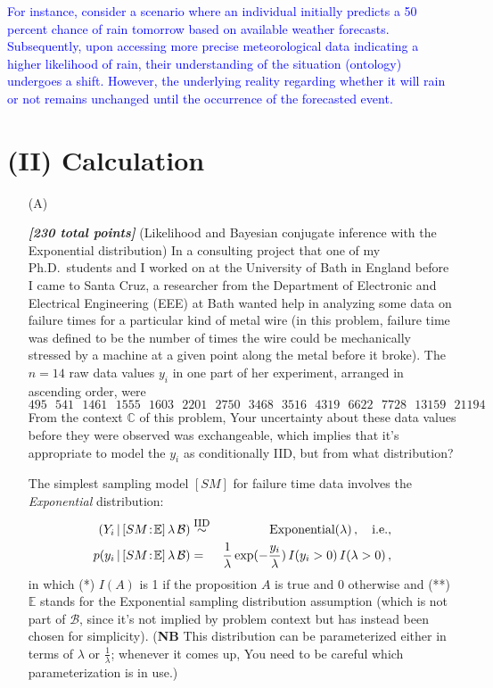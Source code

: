 \documentclass[12pt]{article}
\newcommand{\given}{\, | \,}
\newcommand{\bi}[1]{\b{\i{#1}}}
\renewcommand{\b}[1]{\textbf{#1}}
\renewcommand{\i}[1]{\textit{#1}}
\renewcommand{\r}[1]{\text{#1}}
\begin{document}
\begin{itemize}
\textcolor{blue}{For instance, consider a scenario where an individual initially predicts a 50 percent chance of rain tomorrow based on available weather forecasts. Subsequently, upon accessing more precise meteorological data indicating a higher likelihood of rain, their understanding of the situation (ontology) undergoes a shift. However, the underlying reality regarding whether it will rain or not remains unchanged until the occurrence of the forecasted event.}


\end{itemize}

\section*{(II) Calculation}

\begin{itemize}

\item[(A)]

\bi{[230 total points]} (Likelihood and Bayesian conjugate inference with the Exponential distribution) In a consulting project that one of my Ph.D.~students and I worked on at the University of Bath in England before I came to Santa Cruz, a researcher from the Department of Electronic and Electrical Engineering (EEE) at Bath wanted help in analyzing some data on failure times for a particular kind of metal wire (in this problem, failure time was defined to be the number of times the wire could be mechanically stressed by a machine at a given point along the metal before it broke). The $n = 14$ raw data values $y_i$ in one part of her experiment, arranged in ascending order, were 
\[ 
495 \ \ \ 541 \ \ \ 1461 \ \ \ 1555 \ \ \ 1603 \ \ \ 2201 \ \ \ 2750 \ \ \
3468 \ \ \ 3516 \ \ \ 4319 \ \ \ 6622 \ \ \ 7728 \ \ \ 13159 \ \ \ 21194 
\] 
From the context $\mathbb{ C }$ of this problem, Your uncertainty about these data values before they were observed was exchangeable, which implies that it's appropriate to model the $y_i$ as conditionally IID, but from what distribution?

The simplest sampling model $[ SM ]$ for failure time data involves the \textit{Exponential} distribution: 
\begin{eqnarray} \label{e:exponential-model-1}
( Y_i \given [ SM \! : \! \mathbb{ E } ] \, \lambda \, \mathcal{ B } ) & \stackrel{ \mbox{\footnotesize IID} }{ \sim } & \textrm{Exponential} ( \lambda ) \, , \ \ \ \r{i.e.,} \nonumber \\ p( y_i \given [ SM \! : \! \mathbb{ E } ] \, \lambda \,  \mathcal{ B } ) & = & \frac{ 1 }{ \lambda } \exp( - \frac{ y_i }{ \lambda } ) \, I ( y_i > 0 ) \, I ( \lambda > 0 ) \, ,
\end{eqnarray}
in which (*) $I ( A )$ is 1 if the proposition $A$ is true and 0 otherwise and (**) $\mathbb{ E }$ stands for the Exponential sampling distribution assumption (which is not part of $\mathcal{ B }$, since it's not implied by problem context but has instead been chosen for simplicity). (\textbf{NB} This distribution can be parameterized either in terms of $\lambda$ or $\frac{ 1 }{ \lambda }$; whenever it comes up, You need to be careful which parameterization is in use.)


\end{itemize}
\end{document}
